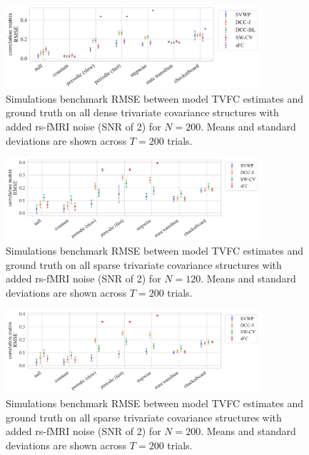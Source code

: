 \begin{figure}[ht]
  \centering
  \includegraphics[width=0.84\textwidth]{fig/sim/d3d/N0200_T0200/no_noise/correlation_matrix_RMSE}
  \caption{
    Simulations benchmark RMSE between model TVFC estimates and ground truth on all dense trivariate covariance structures with added rs-fMRI noise (SNR of 2) for $N = 200$.
    Means and standard deviations are shown across $T = 200$ trials.
  }\label{fig:results-sim-d3d-200-no-noise-all-correlation-matrix-RMSE}
\end{figure}


\begin{figure}[ht]
  \centering
  \includegraphics[width=0.84\textwidth]{fig/sim/d3s/N0120_T0200/no_noise/correlation_matrix_RMSE}
  \caption{
    Simulations benchmark RMSE between model TVFC estimates and ground truth on all sparse trivariate covariance structures with added rs-fMRI noise (SNR of 2) for $N = 120$.
    Means and standard deviations are shown across $T = 200$ trials.
  }\label{fig:results-sim-d3s-120-no-noise-all-correlation-matrix-RMSE}
\end{figure}


\begin{figure}[ht]
  \centering
  \includegraphics[width=0.84\textwidth]{fig/sim/d3s/N0200_T0200/no_noise/correlation_matrix_RMSE}
  \caption{
    Simulations benchmark RMSE between model TVFC estimates and ground truth on all sparse trivariate covariance structures with added rs-fMRI noise (SNR of 2) for $N = 200$.
    Means and standard deviations are shown across $T = 200$ trials.
  }\label{fig:results-sim-d3s-200-no-noise-all-correlation-matrix-RMSE}
\end{figure}
